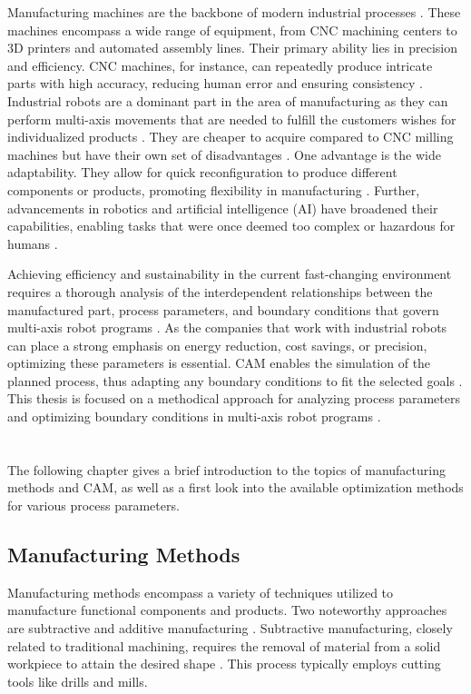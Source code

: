 \documentclass[ZLstudentexpose%
              ,optBiber%
              ,optEnglish%
              ,10pt
              ]{ZLlatex}%
\begin{document}
Manufacturing machines are the backbone of modern industrial processes \cite{Bi.2020}. These machines encompass a wide range of equipment, from CNC machining centers to 3D printers and automated assembly lines. Their primary ability lies in precision and efficiency. CNC machines, for instance, can repeatedly produce intricate parts with high accuracy, reducing human error and ensuring consistency \cite{Jia.2018}. \newline
Industrial robots are a dominant part in the area of manufacturing as they can perform multi-axis movements that are needed to fulfill the customers wishes for individualized products \cite{Sherwani.2020}. They are cheaper to acquire compared to CNC milling machines but have their own set of disadvantages \cite{Iglesias.2015}. One advantage is the wide adaptability. They allow for quick reconfiguration to produce different components or products, promoting flexibility in manufacturing \cite{Billard.2019}. Further, advancements in robotics and artificial intelligence (AI) have broadened their capabilities, enabling tasks that were once deemed too complex or hazardous for humans \cite{Goel.2020}. \newline

Achieving efficiency and sustainability in the current fast-changing environment requires a thorough analysis of the interdependent relationships between the manufactured part, process parameters, and boundary conditions that govern multi-axis robot programs \cite{Pan}. As the companies that work with industrial robots can place a strong emphasis on energy reduction, cost savings, or precision, optimizing these parameters is essential. CAM enables the simulation of the planned process, thus adapting any boundary conditions to fit the selected goals \cite{Kyratsis.2020,Maiti.2017}.
This thesis is focused on a methodical approach for analyzing process parameters and optimizing boundary conditions in multi-axis robot programs \cite{Pan}. 

\section{}%
The following chapter gives a brief introduction to the topics of manufacturing methods and CAM, as well as a first look into the available optimization methods for various process parameters. 
\subsection{Manufacturing Methods}
Manufacturing methods encompass a variety of techniques utilized to manufacture functional components and products. Two noteworthy approaches are subtractive and additive manufacturing \cite{Iqbal.2020}. Subtractive manufacturing, closely related to traditional machining, requires the removal of material from a solid workpiece to attain the desired shape \cite{Watson.2015}. This process typically employs cutting tools like drills and mills.
\end{document}
